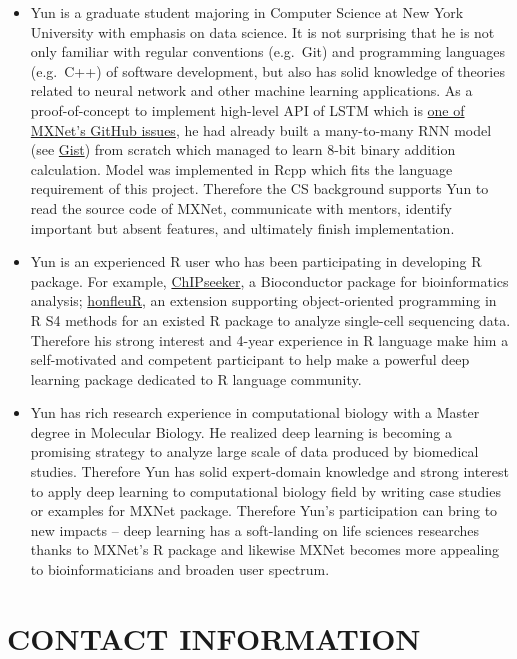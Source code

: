 \documentclass[]{article}
\providecommand{\tightlist}{%
  \setlength{\itemsep}{0pt}\setlength{\parskip}{0pt}}
\begin{document}
\begin{itemize}
\tightlist
\item
  Yun is a graduate student majoring in Computer Science at New York
  University with emphasis on data science. It is not surprising that he
  is not only familiar with regular conventions (e.g.~Git) and
  programming languages (e.g.~C++) of software development, but also has
  solid knowledge of theories related to neural network and other
  machine learning applications. As a proof-of-concept to implement
  high-level API of LSTM which is
  \href{https://github.com/dmlc/mxnet/issues/1420}{one of MXNet's GitHub
  issues}, he had already built a many-to-many RNN model (see
  \href{https://gist.github.com/Puriney/072a37ea8a181f0b6168}{Gist})
  from scratch which managed to learn 8-bit binary addition calculation.
  Model was implemented in Rcpp which fits the language requirement of
  this project. Therefore the CS background supports Yun to read the
  source code of MXNet, communicate with mentors, identify important but
  absent features, and ultimately finish implementation.
\item
  Yun is an experienced R user who has been participating in developing
  R package. For example,
  \href{https://bioconductor.org/packages/release/bioc/html/ChIPseeker.html}{ChIPseeker},
  a Bioconductor package for bioinformatics analysis;
  \href{https://github.com/Puriney/honfleuR}{honfleuR}, an extension
  supporting object-oriented programming in R S4 methods for an existed
  R package to analyze single-cell sequencing data. Therefore his strong
  interest and 4-year experience in R language make him a self-motivated
  and competent participant to help make a powerful deep learning
  package dedicated to R language community.
\item
  Yun has rich research experience in computational biology with a
  Master degree in Molecular Biology. He realized deep learning is
  becoming a promising strategy to analyze large scale of data produced
  by biomedical studies. Therefore Yun has solid expert-domain knowledge
  and strong interest to apply deep learning to computational biology
  field by writing case studies or examples for MXNet package. Therefore
  Yun's participation can bring to new impacts -- deep learning has a
  soft-landing on life sciences researches thanks to MXNet's R package
  and likewise MXNet becomes more appealing to bioinformaticians and
  broaden user spectrum.
\end{itemize}

\section{CONTACT INFORMATION}\label{contact-information}
\end{document}
